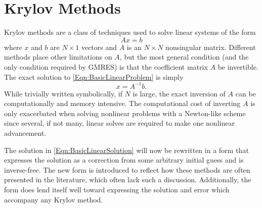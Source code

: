 \documentclass[Prelim,12pt]{WisconsinThesis}
\newcommand{\by}    {\!\times\!}
\begin{document}
\section{Krylov Methods}
Krylov methods are a class of techniques used to solve linear systems of the form
\begin{equation}
    A x = b
    \label{Eqn:BasicLinearProblem}
\end{equation}
where $x$ and $b$ are $N \by 1$ vectors and $A$ is an $N \by N$ nonsingular matrix.
Different methods place other limitations on $A$, but the most general condition (and the only condition required by GMRES) is that the coefficient matrix $A$ be invertible.
The exact solution to \cref{Eqn:BasicLinearProblem} is simply
\begin{equation}
    x = A^{-1} b.
    \label{Eqn:BasicLinearSolution}
\end{equation}
While trivially written symbolically, if $N$ is large, the exact inversion of $A$ can be computationally and memory intensive.
The computational cost of inverting $A$ is only exacerbated when solving nonlinear problems with a Newton-like scheme since several, if not many, linear solves are required to make one nonlinear advancement.



The solution in \cref{Eqn:BasicLinearSolution} will now be rewritten in a form that expresses the solution as a correction from some arbitrary initial guess and is inverse-free.
The new form is introduced to reflect how these methods are often presented in the literature, which often lack such a discussion.
Additionally, the form does lend itself well toward expressing the solution and error which accompany any Krylov method.
\end{document}
